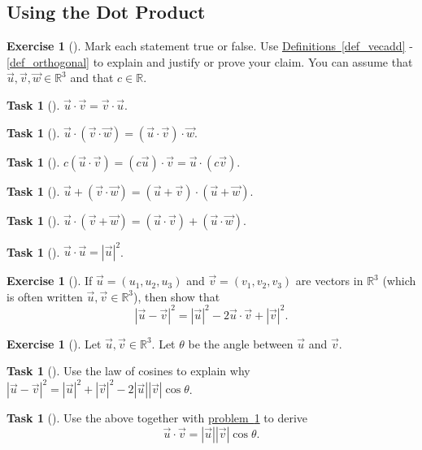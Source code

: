 \documentclass[10pt,]{book}
\theoremstyle{plain}
\theoremstyle{definition}
\theoremstyle{definition}
\theoremstyle{definition}
\theoremstyle{definition}
\newtheorem{exploration}[project]{Exercise}
\newtheorem{task}[project]{Task}
\theoremstyle{definition}
\numberwithin{equation}{section}
\begin{document}
\subsection[{Using the Dot Product}]{Using the Dot Product}\label{subsection-9}
\begin{exploration}[]\label{dot_product_facts}
Mark each statement true or false. Use \hyperref[def_vecadd]{Definitions~\ref{def_vecadd}} - \hyperref[def_orthogonal]{\ref{def_orthogonal}} to explain and justify or prove your claim. You can assume that \(\vec u,\vec v,\vec w\in\mathbb{R}^3\) and that \(c\in\mathbb{R}\).%
\begin{task}[]\label{task-62}
\(\vec u\cdot \vec v=\vec v\cdot \vec u\).%
\end{task}
\begin{task}[]\label{task-63}
\(\vec u\cdot (\vec v\cdot \vec w)=(\vec u\cdot\vec v)\cdot\vec w\).%
\end{task}
\begin{task}[]\label{task-64}
\(c(\vec u\cdot \vec v)=(c\vec u)\cdot \vec v=\vec u\cdot (c\vec v)\).%
\end{task}
\begin{task}[]\label{task-65}
\(\vec u+(\vec v\cdot \vec w)=(\vec u+\vec v)\cdot(\vec u+\vec w)\).%
\end{task}
\begin{task}[]\label{task-66}
\(\vec u\cdot (\vec v+ \vec w)=(\vec u\cdot \vec v)+(\vec u\cdot\vec w)\).%
\end{task}
\begin{task}[]\label{task-67}
\(\vec u\cdot \vec u= |\vec u|^2\).%
\end{task}
\end{exploration}
\begin{exploration}[]\label{prob_dot_prep}
If \(\vec u = (u_1,u_2,u_3)\) and \(\vec v= (v_1,v_2,v_3)\) are vectors in \(\mathbb{R}^3\) (which is often written \(\vec u,\vec v\in\mathbb{R}^3\)), then show that%
\begin{equation*}
|\vec u-\vec v|^2 = |\vec u|^2-2\vec u\cdot \vec v +|\vec v|^2.
\end{equation*}
%
\end{exploration}
\begin{exploration}[]\label{prob_dot_angle_formula}
Let \(\vec u,\vec v\in\mathbb{R}^3\). Let \(\theta\) be the angle between \(\vec u\) and \(\vec v\).%
\begin{task}[]\label{task-68}
Use the law of cosines to explain why \(|\vec u-\vec v|^2=|\vec u|^2+|\vec v|^2-2|\vec u||\vec v|\cos\theta\).%
\end{task}
\begin{task}[]\label{task-69}
Use the above together with \hyperref[prob_dot_prep]{problem~\ref{prob_dot_prep}} to derive%
\begin{equation*}
\vec u\cdot \vec v=|\vec u||\vec v|\cos\theta.
\end{equation*}
%
\end{task}
\end{exploration}
\end{document}
